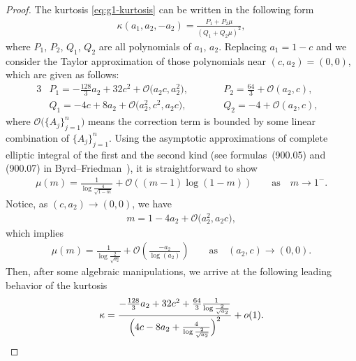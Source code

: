 \documentclass[pdftex]{sigma}
\numberwithin{equation}{section}
\def\ra{\rightarrow}
\newcommand{\bigo}{\mathcal{O}}
\begin{document}
\begin{proof}The kurtosis \eqref{eq:g1-kurtosis} can be written in the following form
\begin{align*}
\kappa(a_1,a_2,-a_2)=\frac{P_1+P_2\mu}{(Q_1+Q_2\mu)^2},
\end{align*}
where $P_1$, $P_2$, $Q_1$, $Q_2$ are all polynomials of $a_1$, $a_2$. Replacing $a_1=1-c$ and we consider the Taylor approximation of those polynomials near $(c,a_2)=(0,0)$, which are given as follows:
\begin{alignat*}{3}
&P_1=-\frac{128}{3}a_2+32c^2+\bigo\bigl(a_2c,a_2^2\bigr),\qquad && P_2=\frac{64}{3}+\bigo(a_2,c),&\\
&Q_1=-4c+8a_2+\bigo\bigl(a_2^2, c^2, a_2c\bigr),\qquad && Q_2=-4+\bigo(a_2,c),&
\end{alignat*}
where $\bigo\bigl(\{A_j\}_{j=1}^n\bigr)$ means the correction term is bounded by some linear combination of $\{A_j\}_{j=1}^n$. Using the asymptotic approximations of complete elliptic integral of the first and the second kind (see formulas~(900.05) and (900.07) in Byrd--Friedman~\cite{BFbook}), it is straightforward to show
\begin{align*}
\mu(m)=\frac{1}{\log\frac{4}{\sqrt{1-m}}}+\bigo((m-1)\log(1-m))\qquad \text{as} \quad m\ra 1^-.
\end{align*}
Notice, as $(c,a_2)\ra (0,0)$, we have
\begin{align*}
m=1-4a_2+\bigo\bigl(a_2^2,a_2c\bigr),
\end{align*}
which implies
\begin{align*}
\mu(m)=\frac{1}{\log\frac{2}{\sqrt{a_2}}}+\bigo\left(\frac{-a_2}{\log(a_2)}\right) \qquad \text{as}\quad (a_2,c)\ra (0,0).
\end{align*}
Then, after some algebraic manipulations, we arrive at the following leading behavior of the kurtosis
\begin{align*}
\kappa = \frac{-\frac{128}{3}a_2+32c^2+\frac{64}{3}\frac{1}{\log\frac{2}{\sqrt{a_2}}}}{\Bigl(4c-8a_2+\frac{4}{\log\frac{2}{\sqrt{a_2}}}\Bigr)^2}+o(1).
\end{align*}


\end{proof}
\end{document}
